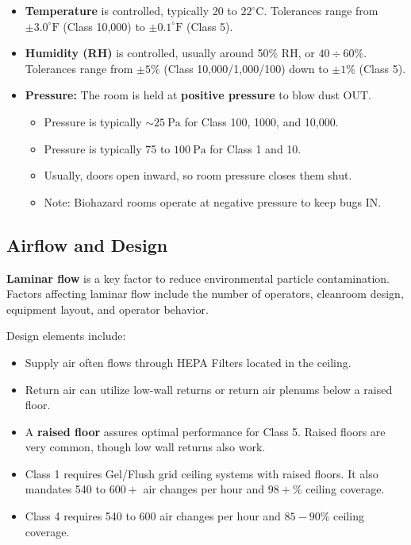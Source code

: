 \documentclass{report}
\begin{document}
\begin{itemize}
    \item \textbf{Temperature} is controlled, typically 20 to $22^{\circ} \text{C}$. Tolerances range from $\pm 3.0^{\circ} \text{F}$ (Class 10,000) to $\pm 0.1^{\circ} \text{F}$ (Class 5).
    \item \textbf{Humidity (RH)} is controlled, usually around 50\% RH, or $40\div 60\%$. Tolerances range from $\pm 5\%$ (Class 10,000/1,000/100) down to $\pm 1\%$ (Class 5).
    \item \textbf{Pressure:} The room is held at \textbf{positive pressure} to blow dust OUT.
    \begin{itemize}
        \item Pressure is typically $\sim 25~\text{Pa}$ for Class 100, 1000, and 10,000.
        \item Pressure is typically 75 to $100~\text{Pa}$ for Class 1 and 10.
        \item Usually, doors open inward, so room pressure closes them shut.
        \item Note: Biohazard rooms operate at negative pressure to keep bugs IN.
    \end{itemize}
\end{itemize}

\subsection{Airflow and Design}

\textbf{Laminar flow} is a key factor to reduce environmental particle contamination. Factors affecting laminar flow include the number of operators, cleanroom design, equipment layout, and operator behavior.

Design elements include:
\begin{itemize}
    \item Supply air often flows through HEPA Filters located in the ceiling.
    \item Return air can utilize low-wall returns or return air plenums below a raised floor.
    \item A \textbf{raised floor} assures optimal performance for Class 5. Raised floors are very common, though low wall returns also work.
    \item Class 1 requires Gel/Flush grid ceiling systems with raised floors. It also mandates 540 to $600+$ air changes per hour and $98+\%$ ceiling coverage.
    \item Class 4 requires 540 to 600 air changes per hour and $85-90\%$ ceiling coverage.
\end{itemize}
\end{document}
